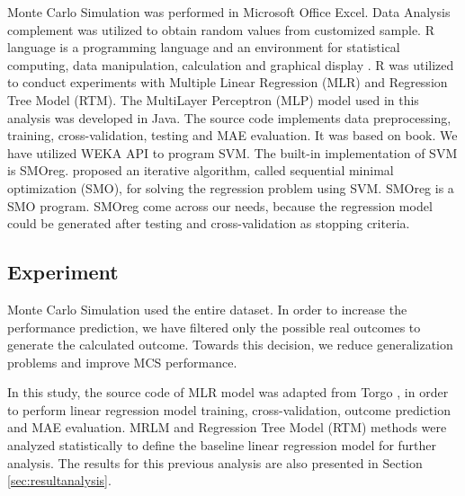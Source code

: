 \documentclass[a4paper,twoside]{article}
\begin{document}
\noindent Monte Carlo Simulation was performed in Microsoft Office Excel. Data Analysis complement was utilized to obtain random values from customized sample. R language is a programming language and an environment for statistical computing, data manipulation, calculation and graphical display \cite{venables2002introduction}. R was utilized to conduct experiments with Multiple Linear Regression (MLR) and Regression Tree Model (RTM). The MultiLayer Perceptron (MLP) model used in this analysis was developed in Java. The source code implements data preprocessing, training, cross-validation, testing and MAE evaluation. It was based on \cite{valenca2005aplicando} book. We have utilized WEKA API \cite{hall2009weka} to program SVM. The built-in implementation of SVM is SMOreg. \cite{Smola1998} proposed an iterative algorithm, called sequential minimal optimization (SMO), for solving the regression problem using SVM. SMOreg is a SMO program. SMOreg come across our needs, because the regression model could be generated after testing and cross-validation as stopping criteria.

\subsection{Experiment}
\label{sec:experiment}

\noindent Monte Carlo Simulation used the entire dataset. In order to increase the performance prediction, we have filtered only the possible real outcomes to generate the calculated outcome. Towards this decision, we reduce generalization problems and improve MCS performance.

In this study, the source code of MLR model was adapted from Torgo \cite{torgo2003data}, in order to perform linear regression model training, cross-validation, outcome prediction and MAE evaluation. MRLM and Regression Tree Model (RTM) methods were analyzed statistically to define the baseline linear regression model for further analysis. The results for this previous analysis are also presented in Section \ref{sec:resultanalysis}.
\end{document}
